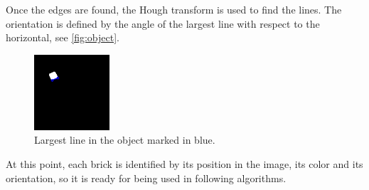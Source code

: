 Once the edges are found, the Hough transform is used to find the lines. The orientation is defined by the angle of the largest line with respect to the horizontal, see \autoref{fig:object}.

\begin{figure}[H]
    \includegraphics[width=0.25\textwidth]{figures/object.png}
    \caption{Largest line in the object marked in blue.}
    \label{fig:object}
\end{figure}

At this point, each brick is identified by its position in the image, its color and its orientation, so it is ready for being used in following algorithms.